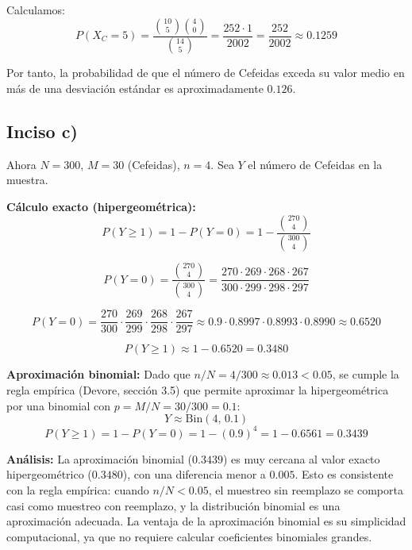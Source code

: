 \documentclass[12pt]{article}
\begin{document}
Calculamos:
$$P(X_C=5)=\frac{\binom{10}{5}\binom{4}{0}}{\binom{14}{5}}=\frac{252\cdot 1}{2002}=\frac{252}{2002}\approx 0.1259$$

Por tanto, la probabilidad de que el número de Cefeidas exceda su valor medio en más de una desviación estándar es aproximadamente $0.126$.

\subsection*{Inciso c)}

Ahora $N=300$, $M=30$ (Cefeidas), $n=4$. Sea $Y$ el número de Cefeidas en la muestra.

\textbf{Cálculo exacto (hipergeométrica):}
$$P(Y\geq 1)=1-P(Y=0)=1-\frac{\binom{270}{4}}{\binom{300}{4}}$$

$$P(Y=0)=\frac{\binom{270}{4}}{\binom{300}{4}}=\frac{270\cdot 269\cdot 268\cdot 267}{300\cdot 299\cdot 298\cdot 297}$$

$$P(Y=0)=\frac{270}{300}\cdot\frac{269}{299}\cdot\frac{268}{298}\cdot\frac{267}{297}\approx 0.9\cdot 0.8997\cdot 0.8993\cdot 0.8990\approx 0.6520$$

$$P(Y\geq 1)\approx 1-0.6520=0.3480$$

\textbf{Aproximación binomial:} Dado que $n/N=4/300\approx 0.013<0.05$, se cumple la regla empírica (Devore, sección 3.5) que permite aproximar la hipergeométrica por una binomial con $p=M/N=30/300=0.1$:
$$Y\approx \text{Bin}(4,\,0.1)$$
$$P(Y\geq 1)=1-P(Y=0)=1-(0.9)^4=1-0.6561=0.3439$$

\textbf{Análisis:} La aproximación binomial ($0.3439$) es muy cercana al valor exacto hipergeométrico ($0.3480$), con una diferencia menor a $0.005$. Esto es consistente con la regla empírica: cuando $n/N<0.05$, el muestreo sin reemplazo se comporta casi como muestreo con reemplazo, y la distribución binomial es una aproximación adecuada. La ventaja de la aproximación binomial es su simplicidad computacional, ya que no requiere calcular coeficientes binomiales grandes.
\end{document}
